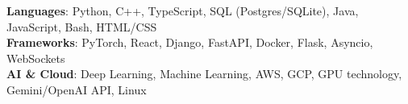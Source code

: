 \begin{itemize}[leftmargin=0.15in, label={}]
    \small{\item{
     \textbf{Languages}{: Python, C++, TypeScript, SQL (Postgres/SQLite), Java, JavaScript, Bash, HTML/CSS} \\
     \textbf{Frameworks}{: PyTorch, React, Django, FastAPI, Docker, Flask, Asyncio, WebSockets} \\
     \textbf{AI \& Cloud}{: Deep Learning, Machine Learning, AWS, GCP, GPU technology, Gemini/OpenAI API, Linux}
    }}
\end{itemize}
